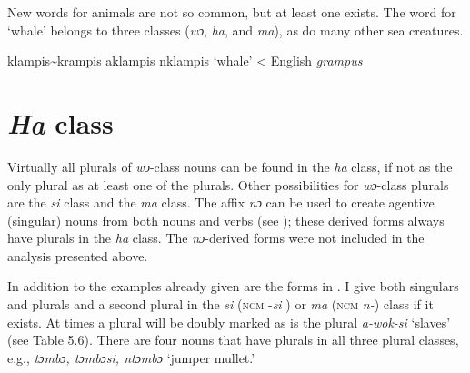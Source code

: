 \z
{}

New words for animals are not so common, but at least one exists. The word for ‘whale' belongs to three classes (\textit{wɔ}, \textit{ha}, and \textit{ma}), as do many other sea creatures.

\TabPositions{2cm,4cm}

\ea%
    \label{ex:141}
    klampis{\textasciitilde}krampis \quad aklampis \quad nklampis \quad ‘whale' < English \textit{grampus}
\z





\section{\textit{Ha} class}
\largerpage
\hypertarget{Toc115517791}{}\label{sec:5.4}
Virtually all plurals of \textit{wɔ}{}-class nouns can be found in the \textit{ha} class, if not as the only plural as at least one of the plurals. Other possibilities for \textit{wɔ}{}-class plurals are the \textit{si} class and the \textit{ma} class. The affix \textit{nɔ} can be used to create agentive (singular) nouns from both nouns and verbs (see ); these derived forms always have plurals in the \textit{ha} class. The \textit{nɔ}{}-derived forms were not included in the analysis presented above.

In addition to the examples already given are the forms in . I give both singulars and plurals and a second plural in the \textit{si} (\textsc{ncm} -\textit{si} ) or \textit{ma} (\textsc{ncm} \textit{n-}) class if it exists. At times a plural will be doubly marked as is the plural \textit{a-wok-si} ‘slaves' (see Table 5.6). There are four nouns that have plurals in all three plural classes, e.g., \textit{tɔmbɔ, tɔmbɔsi, ntɔmbɔ} ‘jumper mullet.'

